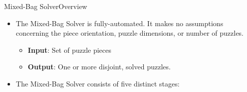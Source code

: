 \documentclass[handout,10pt]{beamer}  %
\begin{document}
\begin{frame}{Mixed-Bag Solver}{Overview}
  \begin{itemize}
    \item The Mixed-Bag Solver is fully-automated.  It makes no assumptions concerning the piece orientation, puzzle dimensions, or number of puzzles.
    \vspace{0.4em}
    \begin{itemize}
      \setlength\itemsep{0.8em}
      \item \textbf{Input}: Set of puzzle pieces
      \item \textbf{Output}: One or more disjoint, solved puzzles.
    \end{itemize}
    \vfill    
    \item The Mixed-Bag Solver consists of five distinct stages:
	  \vspace{-0.4em}
  \end{itemize}
  \begin{center}
    \vfill    
  \end{center}
\end{frame}
\end{document}
